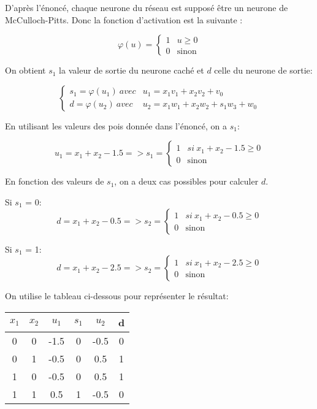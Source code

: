 \documentclass{article}
\begin{document}
\begin{multicols}{2}
D'après l'énoncé, chaque neurone du réseau est supposé être un neurone de
McCulloch-Pitts. Donc la fonction d’activation est la suivante :

$$\varphi(u)=
\begin{cases}
    1& u \geqslant 0\\
    0& \text{sinon}
\end{cases}$$

On obtient $s_1$ la valeur de sortie du neurone caché et $d$ celle du neurone de
sortie:

$$\begin{cases}
    s_1 = \varphi(u_1)\ avec&u_1=x_1v_1 + x_2v_2 + v_0 \\
    d = \varphi(u_2)\ avec&u_2=x_1w_1 + x_2w_2 + s_1w_3 + w_0
\end{cases}$$

En utilisant les valeurs des pois donnée dans l'énoncé, on a $s_1$:

$$u_1 = x_1 + x_2 -1.5  => 
s_1 = 
\begin{cases}
    1& si \ x_1+x_2-1.5 \geqslant 0\\
    0& \text{sinon}
\end{cases}$$

En fonction des valeurs de $s_1$, on a deux cas possibles pour calculer $d$.

Si $s_1$ = 0:
$$d = x_1 + x_2 -0.5  => 
s_2 = 
\begin{cases}
    1& si \ {x_1+x_2-0.5} \geqslant 0\\
    0& \text{sinon}
\end{cases}$$

Si $s_1$ = 1:
$$d = x_1 + x_2 -2.5  => 
s_2 = 
\begin{cases}
    1& si\ x_1+x_2-2.5 \geqslant 0\\
    0& \text{sinon}
\end{cases}$$

On utilise le tableau ci-dessous pour représenter le résultat:

\begin{center}
    \begin{tabular}{|c|c|c|c|c|c|}
        \hline
         $x_{1}$ & $x_{2}$ & $u_1$ & $s_{1}$ & $u_{2}$ & d\\
        \hline
        0 & 0 & -1.5 & 0 & -0.5 & 0\\
        \hline
        0 & 1 & -0.5 & 0 & 0.5 & 1 \\
        \hline
        1 & 0 & -0.5 & 0 & 0.5 & 1 \\
        \hline
        1 & 1 & 0.5 & 1 & -0.5 & 0 \\
        \hline
    \end{tabular}\\
\end{center}


\end{multicols}
\end{document}
